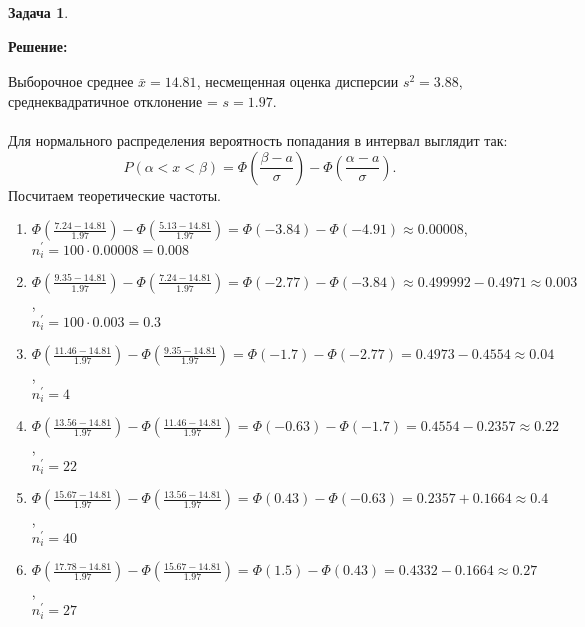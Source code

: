 \documentclass[a4paper,11pt]{article}
\newenvironment{shdd}{\begin{mdframed}[backgroundcolor=shadecolor]}{\end{mdframed}}
\theoremstyle{definition}
\newtheorem{problem}{Задача}\setlength{\parindent}{0pt}
\newenvironment{solution}
{\begin{shdd}
     \textbf{Решение:}\par\setlength{\parindent}{0pt}}
     {
\end{shdd}}
\begin{document}
\begin{problem}
\begin{solution}
            Выборочное среднее \(\bar{x} = 14.81\), несмещенная оценка дисперсии \(\hat{s^2} = 3.88 \),
            среднеквадратичное отклонение = \( s = 1.97 \).
            \\
            \\
            Для нормального распределения вероятность попадания в интервал выглядит так:
            \[
                P(\alpha < x < \beta) = \Phi(\frac{\beta - a}{\sigma}) - \Phi(\frac{\alpha - a}{\sigma}).
            \]
            Посчитаем теоретические частоты.
            \begin{enumerate}
                \item \(\Phi\left(\frac{7.24 - 14.81}{1.97}\right) - \Phi\left(\frac{5.13 - 14.81}{1.97}\right) = \Phi(-3.84) - \Phi(-4.91) \approx 0.00008 \), \\[1em]
                \(n_i^{'} = 100 \cdot 0.00008 = 0.008\)

                \item \(\Phi\left(\frac{9.35 - 14.81}{1.97}\right) - \Phi\left(\frac{7.24 - 14.81}{1.97}\right) = \Phi(-2.77) - \Phi(-3.84) \approx 0.499992 - 0.4971 \approx 0.003\), \\[1em]
                \(n_i^{'} = 100 \cdot 0.003 = 0.3\)

                \item \(\Phi\left(\frac{11.46 - 14.81}{1.97}\right) - \Phi\left(\frac{9.35 - 14.81}{1.97}\right) = \Phi(-1.7) - \Phi(-2.77) = 0.4973 - 0.4554 \approx 0.04\), \\[1em]
                \(n_i^{'} = 4\)

                \item \(\Phi\left(\frac{13.56 - 14.81}{1.97}\right) - \Phi\left(\frac{11.46 - 14.81}{1.97}\right) = \Phi(-0.63) - \Phi(-1.7) = 0.4554 - 0.2357 \approx 0.22\), \\[1em]
                \(n_i^{'} = 22\)

                \item \(\Phi\left(\frac{15.67 - 14.81}{1.97}\right) - \Phi\left(\frac{13.56 - 14.81}{1.97}\right) = \Phi(0.43) - \Phi(-0.63) = 0.2357 + 0.1664 \approx 0.4\), \\[1em]
                \(n_i^{'} = 40\)

                \item \(\Phi\left(\frac{17.78 - 14.81}{1.97}\right) - \Phi\left(\frac{15.67 - 14.81}{1.97}\right) = \Phi(1.5) - \Phi(0.43) = 0.4332 - 0.1664 \approx 0.27\), \\[1em]
                \(n_i^{'} = 27\)


\end{enumerate}
\end{solution}
\end{problem}
\end{document}
